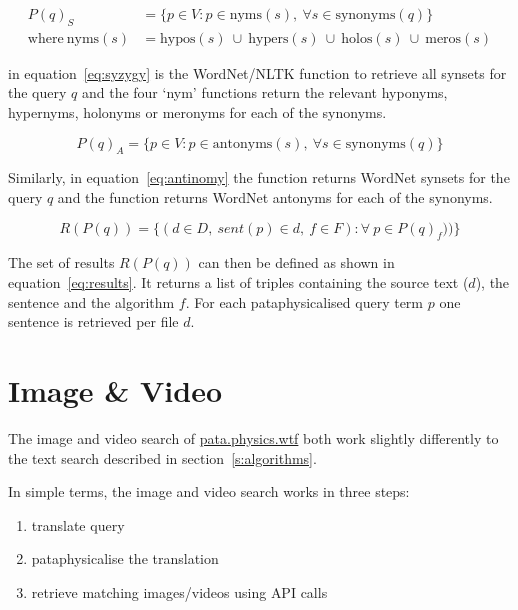 \begin{equation}
  \begin{split}
    P(q)_S &= \{p \in V: p \in \text{nyms}(s), \ \forall s \in \text{synonyms}(q)\}\\
    \text{where} \ \text{nyms}(s) &= \text{hypos}(s) \ \cup \ \text{hypers}(s) \ \cup \ \text{holos}(s) \ \cup \ \text{meros}(s)
  \end{split}
  \label{eq:syzygy}
\end{equation}

 in equation~\ref{eq:syzygy}\sidepar{$\bm{\Sigma}$~\ref{eq:syzygy}} is the WordNet/\ac{NLTK} function to retrieve all synsets for the query $q$ and the four `nym' functions return the relevant hyponyms, hypernyms, holonyms or meronyms for each of the synonyms.

\begin{equation}
  P(q)_A = \{p \in V: p \in \text{antonyms}(s), \ \forall s \in \text{synonyms}(q)\}
  \label{eq:antinomy}
\end{equation}

Similarly, in equation~\ref{eq:antinomy}\sidepar{$\bm{\Sigma}$~\ref{eq:antinomy}} the  function returns WordNet synsets for the query $q$ and the  function returns WordNet antonyms for each of the synonyms.

\begin{equation}
  R(P(q)) = \{(d \in D, \ sent(p) \in d, \ f \in F): \forall \ p \in P(q)_f)) \}
  \label{eq:results}
\end{equation}

The set of results $R(P(q))$ can then be defined as shown in equation~\ref{eq:results}\sidepar{$\bm{\Sigma}$~\ref{eq:results}}. It returns a list of triples containing the source text ($d$), the sentence  and the algorithm $f$. For each pataphysicalised query term $p$ one sentence is retrieved per file $d$.


\section{Image \& Video}
\label{s:imgvid}

The image and video search of \url{pata.physics.wtf} both work slightly differently to the text search described in section~\ref{s:algorithms}.

In simple terms, the image and video search works in three steps:
\begin{enumerate}
  \item translate query
  \item pataphysicalise the translation
  \item retrieve matching images/videos using \ac{API} calls
\end{enumerate}

